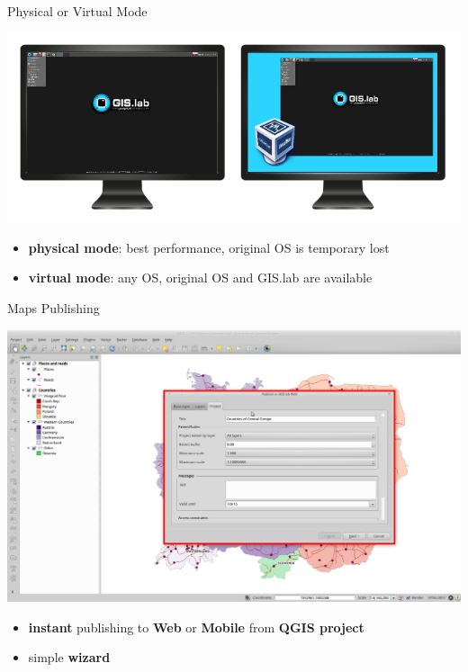 \documentclass[12pt]{beamer}
\begin{document}
\begin{frame}{Physical or Virtual Mode}
	\begin{center}
		\includegraphics[keepaspectratio=true,height=0.5\textheight]{images/physical-or-virtual-mode.png}
	\end{center}
	\begin{itemize}
		\item \textbf{physical mode}: best performance, original OS is temporary lost
		\item \textbf{virtual mode}: any OS, original OS and GIS.lab are available
	\end{itemize}
\end{frame}

\begin{frame}{Maps Publishing}
	\begin{center}
		\includegraphics[keepaspectratio=true,height=0.5\textheight]{images/gislab-publish.png}
	\end{center}
	\begin{itemize}
		\item \textbf{instant} publishing to \textbf{Web} or \textbf{Mobile} from \textbf{QGIS project}
		\item simple \textbf{wizard}
	\end{itemize}
\end{frame}
\end{document}
